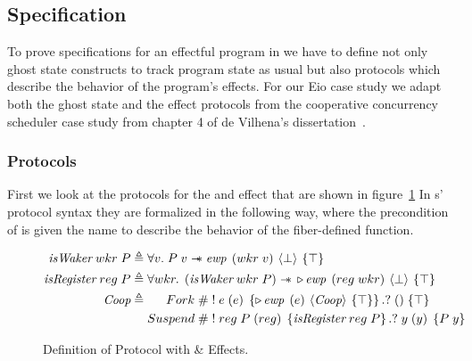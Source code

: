 \subsection{Specification}
\label{sec:sched-spec}

To prove specifications for an effectful program in \hazel{} we have to define not only ghost state constructs to track program state as usual but also protocols which describe the behavior of the program's effects.
For our Eio case study we adapt both the ghost state and the effect protocols from the cooperative concurrency scheduler case study from chapter 4 of de Vilhena's dissertation~\cite{de2022proof}.

\subsubsection{Protocols}
\label{sec:sched-spec-protocols}

First we look at the protocols for the \efork{} and \esuspend{} effect that are shown in figure~\ref{fig:coop-protocol-simpl}
In \hazel{}s' protocol syntax they are formalized in the following way, where the precondition of \esuspend{} is given the name \gsIsReg{} to describe the behavior of the fiber-defined  function.

\begin{figure}[ht]
  \begin{align*}
    \gsIsWaker{}\; wkr\; P & \triangleq \forall v.   \;  P\; v \wand{} \ewp{wkr\; v}{\bot}{\top}                                                                       \\
    \gsIsReg{}\; reg\; P   & \triangleq \forall wkr. \; \left( \gsIsWaker{}\; wkr\; P \right) \wand{} \later \ewp{reg\; wkr}{\bot}{\top}                               \\
    \proto{}               & \triangleq \begin{aligned}[t]
                                          Fork\;    & \# \; !\; e\; (e)\; \left\{\later \ewp{e}{\proto{}}{\top}\right\}. ?\; ()\; \{ \top \}               \\
                                          Suspend\; & \# \; !\; reg\; P\; (reg)\; \left\{\gsIsReg{}\; reg\; P\right\}.?\; y\; (y)\; \left\{ P\; y \right\}
                                        \end{aligned}
  \end{align*}
  \caption{Definition of \proto{} Protocol with \efork{} \& \esuspend{} Effects.}
  \label{fig:coop-protocol-simpl}
\end{figure}

